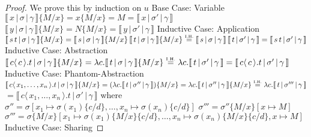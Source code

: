 \documentclass[a4paper,UKenglish,cleveref, autoref]{lipics-v2019}
\newcommand{\abs}[2]{\lambda #1 . #2}
\newcommand{\app}[2]{#1 \, #2}
\newcommand{\fake}[3]{#1 \langle \, #2 \, \rangle . #3}
\newcommand{\sub}[3]{#1 \{ #2 / #3 \}}
\newcommand{\readbackwmap}[3]{\llbracket \, #1 \, \vert \, #2 \, \vert \, #3  \, \rrbracket }
\newcommand{\IH}{\stackrel{\hbox{\tiny I.H.}}{\hbox{=}}}
\begin{document}
\begin{proof}
We prove this by induction on $u$
\newline
\newline
Base Case: Variable
\newline
$\readbackwmap{x}{\sigma}{\gamma} \sub{}{M}{x} = x \sub{}{M}{x} = M = \readbackwmap{x}{\sigma'}{\gamma}$
\newline
\newline
$\readbackwmap{y}{\sigma}{\gamma} \sub{}{M}{x} = N \sub{}{M}{x} = \readbackwmap{y}{\sigma'}{\gamma}$
\newline
\newline
Inductive Case: Application
\newline
$\readbackwmap{\app{s}{t}}{\sigma}{\gamma} \sub{}{M}{x} = \app{\readbackwmap{s}{\sigma}{\gamma} \sub{}{M}{x}}{\readbackwmap{t}{\sigma}{\gamma} \sub{}{M}{x}} \IH \app{\readbackwmap{s}{\sigma}{\gamma}}{\readbackwmap{t}{\sigma'}{\gamma}} = \readbackwmap{\app{s}{t}}{\sigma'}{\gamma}$
\newline
\newline
Inductive Case: Abstraction
\newline
$\readbackwmap{\fake{c}{c}{t}}{\sigma}{\gamma} \sub{}{M}{x} = \abs{c}{\readbackwmap{t}{\sigma}{\gamma} \sub{}{M}{x}} \IH \abs{c}{\readbackwmap{t}{\sigma'}{\gamma}} = \readbackwmap{\fake{c}{c}{t}}{\sigma'}{\gamma}$
\newline
\newline
Inductive Case: Phantom-Abstraction
\newline
$\readbackwmap{\fake{c}{x_{1}, \dots, x_{n}}{t}}{\sigma}{\gamma} \sub{}{M}{x} = (\abs{c}{\readbackwmap{t}{\sigma''}{\gamma}}) \sub{}{M}{x} = \abs{c}{\readbackwmap{t}{\sigma''}{\gamma} \sub{}{M}{x}} \IH \abs{c}{\readbackwmap{t}{\sigma'''}{\gamma}}$
\newline
$= \readbackwmap{\fake{c}{x_{1}, \dots, x_{n}}{t}}{\sigma'}{\gamma}$
\newline
where
\newline
$\sigma'' = \sigma [x_{1} \mapsto \sigma(x_{1}) \sub{}{c}{d} , \dots , x_{n} \mapsto \sigma(x_{n}) \sub{}{c}{d}]$
\newline
$\sigma''' = \sigma'' \sub{}{M}{x} [x \mapsto M]$
\newline
$\sigma''' =  \sigma\sub{}{M}{x} [x_{1} \mapsto \sigma(x_{1}) \sub{}{M}{x} \sub{}{c}{d} , \dots , x_{n} \mapsto \sigma(x_{n}) \sub{}{M}{x} \sub{}{c}{d} , x \mapsto M]$
\newline
\newline
Inductive Case: Sharing

\end{proof}
\end{document}
